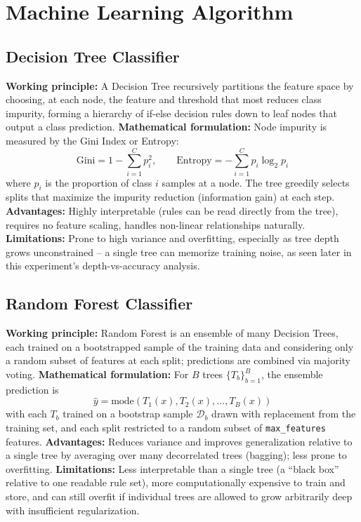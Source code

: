 \documentclass[12pt,a4paper]{article}
\begin{document}
\section{Machine Learning Algorithm}

\subsection*{Decision Tree Classifier}
\textbf{Working principle:} A Decision Tree recursively partitions the feature space by choosing,
at each node, the feature and threshold that most reduces class impurity, forming a hierarchy of
if-else decision rules down to leaf nodes that output a class prediction.
\textbf{Mathematical formulation:} Node impurity is measured by the Gini Index or Entropy:
\begin{equation}
\text{Gini} = 1 - \sum_{i=1}^{C} p_i^2, \qquad
\text{Entropy} = -\sum_{i=1}^{C} p_i \log_2 p_i
\end{equation}
where $p_i$ is the proportion of class $i$ samples at a node. The tree greedily selects splits
that maximize the impurity reduction (information gain) at each step.
\textbf{Advantages:} Highly interpretable (rules can be read directly from the tree), requires no
feature scaling, handles non-linear relationships naturally.
\textbf{Limitations:} Prone to high variance and overfitting, especially as tree depth grows
unconstrained -- a single tree can memorize training noise, as seen later in this experiment's
depth-vs-accuracy analysis.

\subsection*{Random Forest Classifier}
\textbf{Working principle:} Random Forest is an ensemble of many Decision Trees, each trained on
a bootstrapped sample of the training data and considering only a random subset of features at
each split; predictions are combined via majority voting.
\textbf{Mathematical formulation:} For $B$ trees $\{T_b\}_{b=1}^{B}$, the ensemble prediction is
\begin{equation}
\hat{y} = \text{mode}\left(T_1(x), T_2(x), \ldots, T_B(x)\right)
\end{equation}
with each $T_b$ trained on a bootstrap sample $\mathcal{D}_b$ drawn with replacement from the
training set, and each split restricted to a random subset of \texttt{max\_features} features.
\textbf{Advantages:} Reduces variance and improves generalization relative to a single tree by
averaging over many decorrelated trees (bagging); less prone to overfitting.
\textbf{Limitations:} Less interpretable than a single tree (a ``black box'' relative to one
readable rule set), more computationally expensive to train and store, and can still overfit if
individual trees are allowed to grow arbitrarily deep with insufficient regularization.
\end{document}
